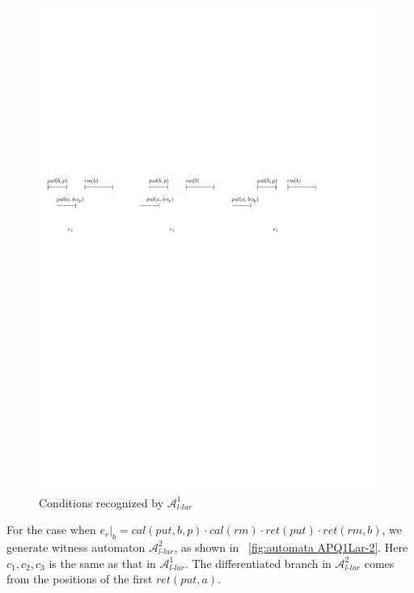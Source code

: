 \begin{figure}[htbp]
  \centering
  \includegraphics[width=1 \textwidth]{figures/PIC_HIS_PQ1Lar-pprr.pdf}
  \caption{Conditions recognized by $\mathcal{A}_{\textit{l-lar}}^1$}
  \label{fig:his for APQ1Lar-1}
\end{figure}


For the case when $e_r \vert_{b} = \textit{cal}(\textit{put},b,p) \cdot \textit{cal}(\textit{rm}) \cdot \textit{ret}(\textit{put}) \cdot \textit{ret}(\textit{rm},b)$, we generate witness automaton $\mathcal{A}_{\textit{l-lar}}^2$, as shown in \figurename~\ref{fig:automata APQ1Lar-2}. Here $c_1,c_2,c_3$ is the same as that in $\mathcal{A}_{\textit{l-lar}}^1$. The differentiated branch in $\mathcal{A}_{\textit{l-lar}}^2$ comes from the positions of the first $\textit{ret}(\textit{put},a)$.

